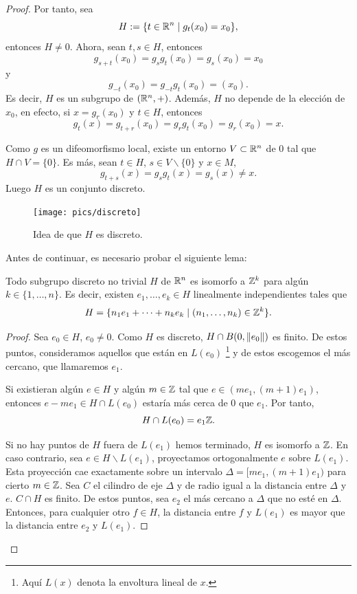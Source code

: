 \begin{proof}
  Por tanto, sea 
\[  
  H:=\{t \in \mathbb{R}^n \mid g_t(x_0)=x_0\},
\]
entonces $H \neq {0}$. Ahora, sean $t, s \in H$, entonces 
\[
  g_{s+t}(x_0)=g_sg_t(x_0)=g_s(x_0)=x_0
\]
y 
\[
  g_{-t}(x_0)=g_{-t}g_t(x_0)=(x_0).
\] 
Es decir, $H$ es un subgrupo de $(\mathbb{R}^n,+)$. Además, $H$ no depende de la elección de $x_0$, en efecto, si $x=g_r (x_0)$ y $t\in H$, entonces 
\[
  g_t (x) = g_{t+r}(x_0)=g_rg_t(x_0)=g_r(x_0)=x. 
 \] 

 Como $g$ es un difeomorfismo local, existe un entorno $V\subset \mathbb{R}^n$ de 0 tal que $H\cap V= \{0\}$. Es más, sean $t\in H$, $s\in V\backslash \{0\}$ y $x\in M$, 
  \[
    g_{t+s}(x)=g_sg_t(x)=g_s(x)\neq x.
  \]
  Luego $H$ es un conjunto discreto.
  \begin{figure}[h]
    \centering
    \texttt{[image: pics/discreto]}
    \caption{Idea de que $H$ es discreto.}
    \label{fig:discreto}
  \end{figure}

  Antes de continuar, es necesario probar el siguiente lema:

  \begin{lema}
    Todo subgrupo discreto no trivial $H$ de $\mathbb{R}^n$ es isomorfo a $\mathbb{Z}^k$ para algún $k\in\{1,\dots,n\}$. Es decir, existen $e_1,\dots,e_k \in H$ linealmente independientes tales que 
    \[
      H=\{n_1e_1+\cdots+n_ke_k \mid (n_1,\dots,n_k) \in \mathbb{Z}^k \}.
    \]
  \end{lema}
  \begin{proof} 
  Sea $e_0 \in H$, $e_0 \neq 0$. Como $H$ es discreto, $H \cap B(0,\left\Vert e_0\right\Vert)$ es finito. De estos puntos, consideramos aquellos que están en $L(e_0)$ \footnote{Aquí $L(x)$ denota la envoltura lineal de $x$.} y de estos escogemos el más cercano, que llamaremos $e_1$. 
  
  Si existieran algún $e \in H$ y algún $m \in \mathbb{Z}$ tal que $e \in (me_1,(m+1)e_1)$, entonces $e-me_1 \in H \cap L(e_0)$ estaría más cerca de 0 que $e_1$. Por tanto, 
  \[
    H\cap L(e_0) = e_1\mathbb{Z}.
  \]

  Si no hay puntos de $H$ fuera de $L(e_1)$ hemos terminado, $H$ es isomorfo a $\mathbb{Z}$. En caso contrario, sea $e \in H \backslash L(e_1)$, proyectamos ortogonalmente $e$ sobre $L(e_1)$. Esta proyección cae exactamente sobre un intervalo $\Delta=[me_1,(m+1)e_1)$ para cierto $m \in \mathbb{Z}$. Sea $C$ el cilindro de eje $\Delta$ y de radio igual a la distancia entre $\Delta$ y $e$. $C\cap H$ es finito. De estos puntos, sea $e_2$ el más cercano a $\Delta$ que no esté en $\Delta$. Entonces, para cualquier otro $f \in H$, la distancia entre $f$ y $L(e_1)$ es mayor que la distancia entre $e_2$ y $L(e_1)$. 
    

\end{proof}
\end{proof}
